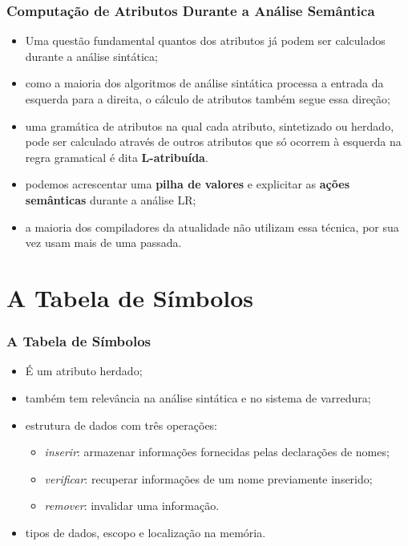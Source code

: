 \documentclass[table]{beamer}
\begin{document}
\begin{frame}
   \frametitle{Computação de Atributos Durante a Análise Semântica}
   \begin{itemize}
      \item Uma questão fundamental quantos dos atributos já podem ser calculados durante a análise sintática;
      \item como a maioria dos algoritmos de análise sintática processa a entrada da esquerda para a direita, o cálculo de atributos também segue essa direção;
      \item uma gramática de atributos na qual cada atributo, sintetizado ou herdado, pode ser calculado através de outros atributos que só ocorrem à esquerda na regra gramatical é dita \textbf{L-atribuída}.
      \item podemos acrescentar uma \textbf{pilha de valores} e explicitar as \textbf{ações semânticas} durante a análise LR;
      \item a maioria dos compiladores da atualidade não utilizam essa técnica, por sua vez usam mais de uma passada.
   \end{itemize}
\end{frame}

\section{A Tabela de Símbolos}
\begin{frame}
   \frametitle{A Tabela de Símbolos}
   \begin{itemize}
      \item É um atributo herdado;
      \item também tem relevância na análise sintática e no sistema de varredura;
      \item estrutura de dados com três operações:
      \begin{itemize}
         \item \textit{inserir}: armazenar informações fornecidas pelas declarações de nomes;
	 \item \textit{verificar}: recuperar informações de um nome previamente inserido;
	 \item \textit{remover}: invalidar uma informação.
      \end{itemize}
      \item tipos de dados, escopo e localização na memória.
   \end{itemize}
\end{frame}
\end{document}
